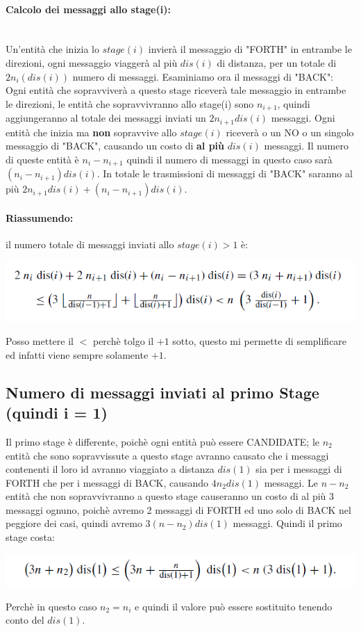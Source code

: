 \paragraph{Calcolo dei messaggi allo stage(i):}\ \\
Un'entità che inizia lo $stage(i)$ invierà il messaggio di "FORTH" in entrambe
le direzioni, ogni messaggio viaggerà al più $dis(i)$ di distanza, per un totale
di $2n_i(dis(i))$ numero di messaggi. Esaminiamo ora il messaggi di "BACK": Ogni
entità che sopravviverà a questo stage riceverà tale messaggio in entrambe le
direzioni, le entità che sopravvivranno allo stage(i) sono $n_{i+1}$, quindi
aggiungeranno al totale dei messaggi inviati un $2n_{i+1}dis(i)$ messaggi. Ogni
entità che inizia ma \textbf{non} sopravvive allo $stage(i)$ riceverà o un NO o
un singolo messaggio di "BACK", causando un costo di \textbf{al più} $dis(i)$
messaggi. Il numero di queste entità è $n_i - n_{i+1}$ quindi il numero di
messaggi in questo caso sarà  $(n_i - n_{i+1})dis(i)$. In totale le trasmissioni
di messaggi di "BACK" saranno al più $2n_{i+1}dis(i) + (n_i - n_{i+1})dis(i)$.

\paragraph{Riassumendo:} il numero totale di messaggi inviati allo $stage(i) > 1$
è:
\begin{center}
    \includegraphics[scale=0.6]{aa/bb.png}
\end{center}
Posso mettere il $<$ perchè tolgo il $+1$ sotto, questo mi permette di
semplificare ed infatti viene sempre solamente $+1$.


\subsection{Numero di messaggi inviati al primo Stage (quindi i = 1)}
Il primo stage è differente, poichè ogni entità può essere CANDIDATE; le $n_2$
entità che sono sopravvissute a questo stage avranno causato che i messaggi
contenenti il loro id avranno viaggiato a distanza $dis(1)$ sia per i messaggi
di FORTH che per i messaggi di BACK, causando $4n_2dis(1)$ messaggi. Le $n-n_2$
entità che non sopravvivranno a  questo stage causeranno un costo di al più 3
messaggi ognuno, poichè avremo 2 messaggi di FORTH ed uno solo di BACK nel
peggiore dei casi, quindi avremo $3(n - n_2)dis(1)$ messaggi. Quindi il primo
stage costa:
\begin{center}
    \includegraphics[scale=0.6]{aa/cc.png}
\end{center}
Perchè in questo caso $n_2 = n_i$ e quindi il valore può essere sostituito
tenendo conto del $dis(1)$.


